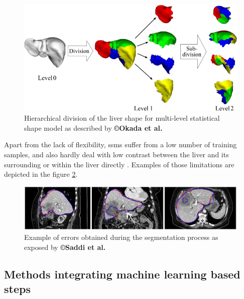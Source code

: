 \begin{figure}[th!]
	\centering
	\includegraphics[width=0.7\linewidth]{images/Okada2008_Fig1}
	\caption{ Hierarchical division of the liver shape for multi-level statistical shape model as described by \textbf{©Okada et al. \cite{Okada2008}}}
	\label{Okada2008_Fig1}
\end{figure}


Apart from the lack of flexibility, \ac{ssm}s suffer from a low number of
training samples, and also hardly deal with low contrast between the
liver and its surrounding or within the liver directly \cite{Saddi2007, Lamecker2004}. Examples of those limitations are depicted in the figure \ref{Saddi2007_Fig}.

\begin{figure}[th!]
	\centering
	\includegraphics[width=0.7\linewidth]{images/image21}
	\caption{Example of errors obtained during the segmentation process as exposed by \textbf{©Saddi et al. \cite{Saddi2007}}}
	\label{Saddi2007_Fig}
\end{figure}

\subsection{Methods integrating machine learning based steps}

